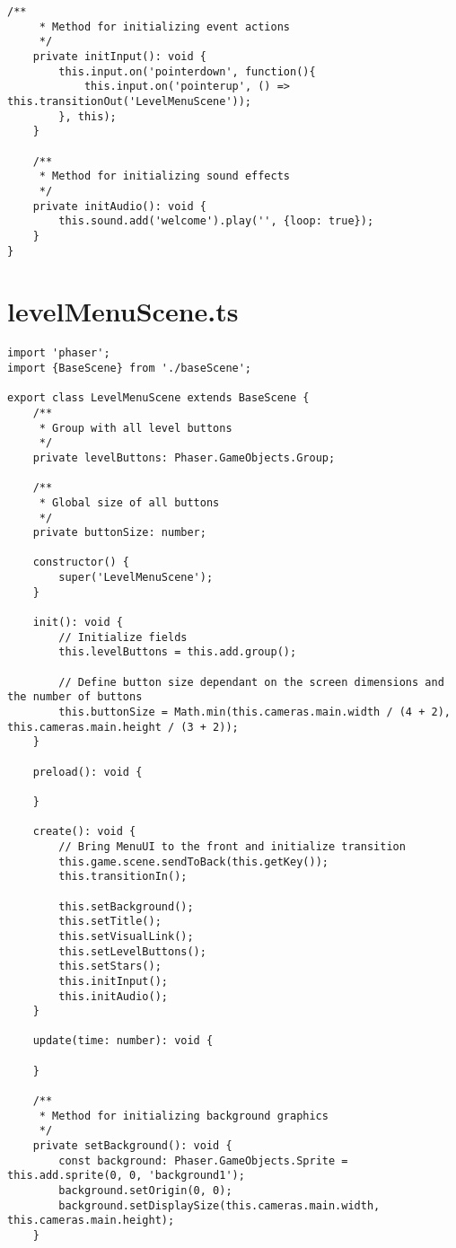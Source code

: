 \begin{lstlisting}[style=TypeScript, caption={}]
    /**
     * Method for initializing event actions
     */
    private initInput(): void {
        this.input.on('pointerdown', function(){
            this.input.on('pointerup', () => this.transitionOut('LevelMenuScene'));
        }, this);
    }

    /**
     * Method for initializing sound effects
     */
    private initAudio(): void {
        this.sound.add('welcome').play('', {loop: true});
    }
}
\end{lstlisting}

\section{levelMenuScene.ts}\label{sec:levelmenuscene.ts}
\begin{lstlisting}[style=TypeScript, caption={levelMenuScene.ts}]
import 'phaser';
import {BaseScene} from './baseScene';

export class LevelMenuScene extends BaseScene {
    /**
     * Group with all level buttons
     */
    private levelButtons: Phaser.GameObjects.Group;

    /**
     * Global size of all buttons
     */
    private buttonSize: number;

    constructor() {
        super('LevelMenuScene');
    }

    init(): void {
        // Initialize fields
        this.levelButtons = this.add.group();

        // Define button size dependant on the screen dimensions and the number of buttons
        this.buttonSize = Math.min(this.cameras.main.width / (4 + 2), this.cameras.main.height / (3 + 2));
    }

    preload(): void {

    }

    create(): void {
        // Bring MenuUI to the front and initialize transition
        this.game.scene.sendToBack(this.getKey());
        this.transitionIn();

        this.setBackground();
        this.setTitle();
        this.setVisualLink();
        this.setLevelButtons();
        this.setStars();
        this.initInput();
        this.initAudio();
    }

    update(time: number): void {

    }

    /**
     * Method for initializing background graphics
     */
    private setBackground(): void {
        const background: Phaser.GameObjects.Sprite = this.add.sprite(0, 0, 'background1');
        background.setOrigin(0, 0);
        background.setDisplaySize(this.cameras.main.width, this.cameras.main.height);
    }


\end{lstlisting}
